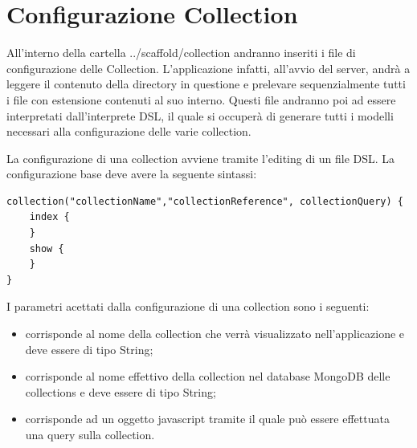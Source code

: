 \section{Configurazione Collection}

All'interno della cartella ../scaffold/collection andranno inseriti i file di configurazione delle Collection. L'applicazione infatti, all'avvio del server, andrà a leggere il contenuto della directory in questione e prelevare sequenzialmente tutti i file con estensione  contenuti al suo interno. Questi file andranno poi ad essere interpretati dall'interprete DSL, il quale si occuperà di generare tutti i modelli necessari alla configurazione delle varie collection.

La configurazione di una collection avviene tramite l'editing di un file DSL. La configurazione base deve avere la seguente sintassi:
\medskip
\begin{lstlisting}
collection("collectionName","collectionReference", collectionQuery) {
	index {
	}
	show {
	}
}		
\end{lstlisting}

I parametri acettati dalla configurazione di una collection sono i seguenti: 
\begin{itemize}
\item[]  corrisponde al nome della collection che verrà visualizzato nell'applicazione e deve essere di tipo String;
\item[]  corrisponde al nome effettivo della collection nel database MongoDB delle collections e deve essere di tipo String;
\item[]  corrisponde ad un oggetto javascript tramite il quale può essere effettuata una query sulla collection.
\end{itemize}

